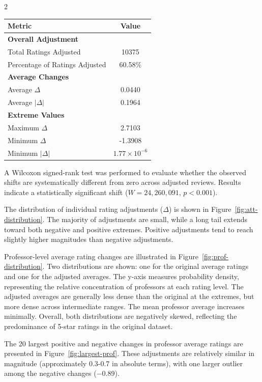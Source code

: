 \documentclass{article}
\begin{document}
\begin{multicols*}{2}
\begin{center}
\label{tab:adjustment-stats}
\begin{tabular}{l c}
\toprule
\textbf{Metric} & \textbf{Value} \\
\midrule
\multicolumn{2}{l}{\textbf{Overall Adjustment}} \\
Total Ratings Adjusted & 10375 \\
Percentage of Ratings Adjusted & 60.58\% \\
\midrule
\multicolumn{2}{l}{\textbf{Average Changes}} \\
Average $\Delta$ & 0.0440 \\
Average $|\Delta|$ & 0.1964 \\
\midrule
\multicolumn{2}{l}{\textbf{Extreme Values}} \\
Maximum $\Delta$ & 2.7103 \\
Minimum $\Delta$ & -1.3908 \\
Minimum $|\Delta|$ & $1.77\times10^{-6}$ \\
\bottomrule
\end{tabular}
\end{center}

A Wilcoxon signed-rank test was performed to evaluate whether the observed shifts are systematically different from zero across adjusted reviews. Results indicate a statistically significant shift ($W = 24{,}260{,}091$, $p < 0.001$).

The distribution of individual rating adjustments ($\Delta$) is shown in Figure~\ref{fig:att-distribution}. The majority of adjustments are small, while a long tail extends toward both negative and positive extremes. Positive adjustments tend to reach slightly higher magnitudes than negative adjustments.

Professor-level average rating changes are illustrated in Figure~\ref{fig:prof-distribution}. Two distributions are shown: one for the original average ratings and one for the adjusted averages. The y-axis measures probability density, representing the relative concentration of professors at each rating level. The adjusted averages are generally less dense than the original at the extremes, but more dense across intermediate ranges. The mean professor average increases minimally. Overall, both distributions are negatively skewed, reflecting the predominance of 5-star ratings in the original dataset.

The 20 largest positive and negative changes in professor average ratings are presented in Figure~\ref{fig:largest-prof}. These adjustments are relatively similar in magnitude (approximately 0.3-0.7 in absolute terms), with one larger outlier among the negative changes ($-$0.89).


\end{multicols*}
\end{document}

